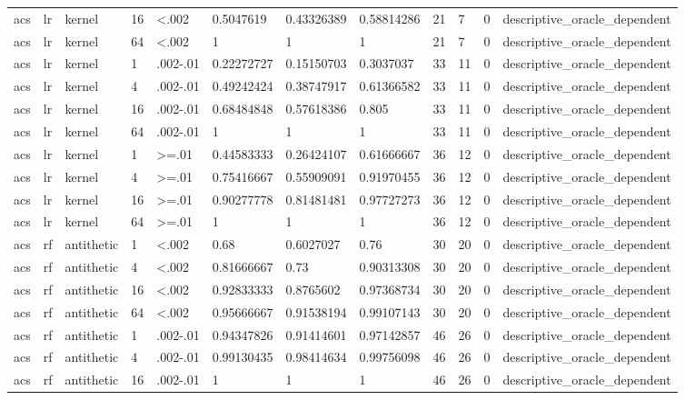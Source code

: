 \begin{tabular}{llllllllllll}
acs & lr & kernel & 16 & <.002 & 0.5047619 & 0.43326389 & 0.58814286 & 21 & 7 & 0 & descriptive\_oracle\_dependent \\
acs & lr & kernel & 64 & <.002 & 1 & 1 & 1 & 21 & 7 & 0 & descriptive\_oracle\_dependent \\
acs & lr & kernel & 1 & .002-.01 & 0.22272727 & 0.15150703 & 0.3037037 & 33 & 11 & 0 & descriptive\_oracle\_dependent \\
acs & lr & kernel & 4 & .002-.01 & 0.49242424 & 0.38747917 & 0.61366582 & 33 & 11 & 0 & descriptive\_oracle\_dependent \\
acs & lr & kernel & 16 & .002-.01 & 0.68484848 & 0.57618386 & 0.805 & 33 & 11 & 0 & descriptive\_oracle\_dependent \\
acs & lr & kernel & 64 & .002-.01 & 1 & 1 & 1 & 33 & 11 & 0 & descriptive\_oracle\_dependent \\
acs & lr & kernel & 1 & >=.01 & 0.44583333 & 0.26424107 & 0.61666667 & 36 & 12 & 0 & descriptive\_oracle\_dependent \\
acs & lr & kernel & 4 & >=.01 & 0.75416667 & 0.55909091 & 0.91970455 & 36 & 12 & 0 & descriptive\_oracle\_dependent \\
acs & lr & kernel & 16 & >=.01 & 0.90277778 & 0.81481481 & 0.97727273 & 36 & 12 & 0 & descriptive\_oracle\_dependent \\
acs & lr & kernel & 64 & >=.01 & 1 & 1 & 1 & 36 & 12 & 0 & descriptive\_oracle\_dependent \\
acs & rf & antithetic & 1 & <.002 & 0.68 & 0.6027027 & 0.76 & 30 & 20 & 0 & descriptive\_oracle\_dependent \\
acs & rf & antithetic & 4 & <.002 & 0.81666667 & 0.73 & 0.90313308 & 30 & 20 & 0 & descriptive\_oracle\_dependent \\
acs & rf & antithetic & 16 & <.002 & 0.92833333 & 0.8765602 & 0.97368734 & 30 & 20 & 0 & descriptive\_oracle\_dependent \\
acs & rf & antithetic & 64 & <.002 & 0.95666667 & 0.91538194 & 0.99107143 & 30 & 20 & 0 & descriptive\_oracle\_dependent \\
acs & rf & antithetic & 1 & .002-.01 & 0.94347826 & 0.91414601 & 0.97142857 & 46 & 26 & 0 & descriptive\_oracle\_dependent \\
acs & rf & antithetic & 4 & .002-.01 & 0.99130435 & 0.98414634 & 0.99756098 & 46 & 26 & 0 & descriptive\_oracle\_dependent \\
acs & rf & antithetic & 16 & .002-.01 & 1 & 1 & 1 & 46 & 26 & 0 & descriptive\_oracle\_dependent \\

\end{tabular}
